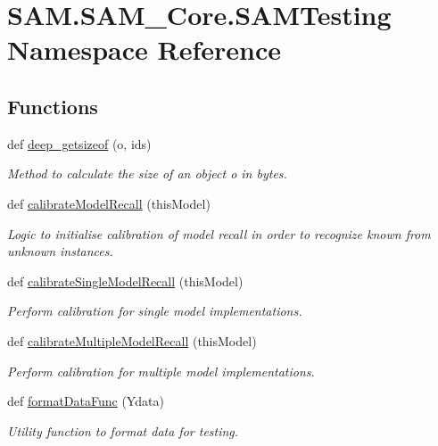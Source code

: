 \hypertarget{namespaceSAM_1_1SAM__Core_1_1SAMTesting}{}\section{S\+A\+M.\+S\+A\+M\+\_\+\+Core.\+S\+A\+M\+Testing Namespace Reference}
\label{namespaceSAM_1_1SAM__Core_1_1SAMTesting}
\subsection*{Functions}
\begin{DoxyCompactItemize}
\item 
def \hyperlink{group__icubclient__SAM__Tests_ga4030a4fb35c568869122103d29b6cc25}{deep\+\_\+getsizeof} (o, ids)
\begin{DoxyCompactList}\small\item\em Method to calculate the size of an object {\ttfamily o} in bytes. \end{DoxyCompactList}\item 
def \hyperlink{group__icubclient__SAM__Tests_ga451f7ba20c084a7482fc4bab4ba0f59d}{calibrate\+Model\+Recall} (this\+Model)
\begin{DoxyCompactList}\small\item\em Logic to initialise calibration of model recall in order to recognize known from unknown instances. \end{DoxyCompactList}\item 
def \hyperlink{group__icubclient__SAM__Tests_ga9c6b9bfe733e2ff320995ec7e0ee9cdf}{calibrate\+Single\+Model\+Recall} (this\+Model)
\begin{DoxyCompactList}\small\item\em Perform calibration for single model implementations. \end{DoxyCompactList}\item 
def \hyperlink{group__icubclient__SAM__Tests_ga609a55c3b5bbf9ab1f9759c240aefd8e}{calibrate\+Multiple\+Model\+Recall} (this\+Model)
\begin{DoxyCompactList}\small\item\em Perform calibration for multiple model implementations. \end{DoxyCompactList}\item 
def \hyperlink{group__icubclient__SAM__Tests_ga5edddf8683ce4a2650429c355e4dd7dd}{format\+Data\+Func} (Ydata)
\begin{DoxyCompactList}\small\item\em Utility function to format data for testing. \end{DoxyCompactList}\item 

\end{DoxyCompactItemize}
